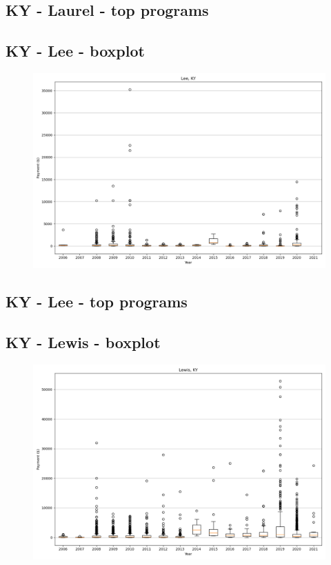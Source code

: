 \subsection*{KY - Laurel - top programs}

\newpage
\subsection*{KY - Lee - boxplot}
\begin{figure}[h]
\centering
\includegraphics[width=7in]{../output/boxplots/counties/Lee-KY_boxplot.png}
\end{figure}


\subsection*{KY - Lee - top programs}

\newpage
\subsection*{KY - Lewis - boxplot}
\begin{figure}[h]
\centering
\includegraphics[width=7in]{../output/boxplots/counties/Lewis-KY_boxplot.png}
\end{figure}


